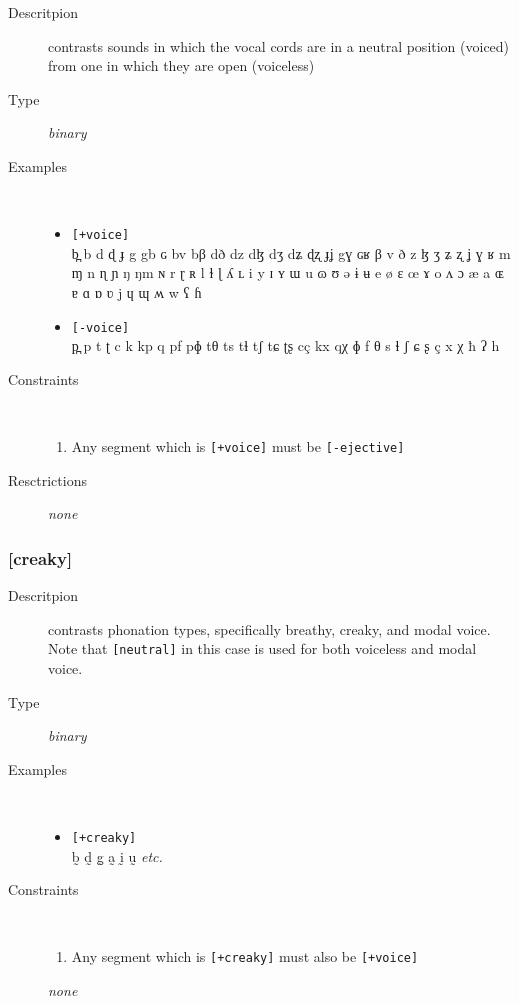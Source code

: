 \documentclass[10pt,letterpaper]{article}
\begin{document}
\begin{description}
\item[Descritpion] contrasts sounds in which the vocal cords are in a neutral position (voiced) from one in which they are open (voiceless)
\item[Type] \emph{binary}
\item[Examples]\
  \begin{itemize}
    \item \texttt{[+voice]}\\
    b̪ b d ɖ ɟ g gb ɢ bv bβ dð dz dɮ dʒ dʑ ɖʐ ɟʝ gɣ ɢʁ β v ð z ɮ ʒ ʑ ʐ ʝ ɣ ʁ m ɱ n ɳ ɲ ŋ ŋm ɴ r ɽ ʀ l ɫ ɭ ʎ ʟ i y ɪ ʏ ɯ u ɷ ʊ ə ɨ ʉ e ø ɛ œ ɤ o ʌ ɔ æ a ɶ ɐ ɑ ɒ ʋ j ɥ ɰ ʍ w ʕ ɦ 
    \item \texttt{[-voice]}\\
    p̪ p t ʈ c k kp q pf pɸ tθ ts tɬ tʃ tɕ ʈʂ cç kx qχ ɸ f θ s ɬ ʃ ɕ ʂ ç x χ ħ ʔ h 
  \end{itemize}
\item[Constraints]\
  \begin{enumerate}
    \item Any segment which is \texttt{[+voice]} must be \texttt{[-ejective]}
  \end{enumerate} 
\item[Resctrictions] \emph{none}
\end{description}

\subsubsection{[creaky]}
\label{ssub:feature_creaky}

\begin{description}
\item[Descritpion] contrasts phonation types, specifically breathy, creaky, and modal voice. Note that \texttt{[neutral]} in this case is used for both voiceless and modal voice.

\item[Type] \emph{binary}
\item[Examples]\
  \begin{itemize}
    \item \texttt{[+creaky]}\\
    b̰ d̰ g̰ a̰ ḭ ṵ \emph{etc.}
  \end{itemize}
\item[Constraints]\
  \begin{enumerate}
    \item Any segment which is \texttt{[+creaky]} must also be \texttt{[+voice]}
  \end{enumerate} \emph{none}
\end{description}
\end{document}
